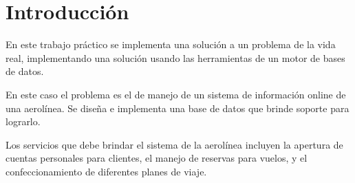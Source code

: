 \section{Introducción}

  En este trabajo práctico se implementa una solución a un problema de 
  la vida real, implementando una solución usando las herramientas
  de un motor de bases de datos. 

  \hspace*{1cm}

  En este caso el problema es el de manejo de un sistema de información
  online de una aerolínea. 
  Se diseña e implementa una base de datos que brinde soporte para
  lograrlo.

  \hspace*{1cm}

  Los servicios que debe brindar el sistema de la aerolínea incluyen
  la apertura de cuentas personales para clientes, el manejo de
  reservas para vuelos, y el confeccionamiento de diferentes
  planes de viaje.